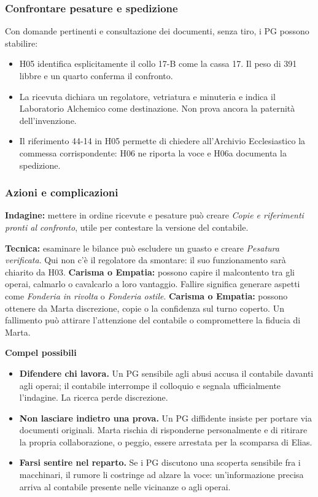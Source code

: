\documentclass[11pt,a4paper]{article}
\newcommand{\aspect}[1]{\textit{\textcolor{blood}{#1}}}
\begin{document}
\subsubsection{Confrontare pesature e spedizione}
\begin{cluebox}
Con domande pertinenti e consultazione dei documenti, senza tiro, i PG possono stabilire:
\begin{itemize}
\item H05 identifica esplicitamente il collo 17-B come la cassa 17. Il peso di 391 libbre e un quarto conferma il confronto.
\item La ricevuta dichiara un regolatore, vetriatura e minuteria e indica il Laboratorio Alchemico come destinazione. Non prova ancora la paternità dell'invenzione.
\item Il riferimento 44-14 in H05 permette di chiedere all'Archivio Ecclesiastico la commessa corrispondente: H06 ne riporta la voce e H06a documenta la spedizione.
\end{itemize}
\end{cluebox}

\subsubsection{Azioni e complicazioni}
\begin{fatebox}
\textbf{Indagine:} mettere in ordine ricevute e pesature può creare \aspect{Copie e riferimenti pronti al confronto}, utile per contestare la versione del contabile.

\textbf{Tecnica:} esaminare le bilance può escludere un guasto e creare \aspect{Pesatura verificata}. Qui non c'è il regolatore da smontare: il suo funzionamento sarà chiarito da H03.
\textbf{Carisma o Empatia:} possono capire il malcontento tra gli operai, calmarlo o cavalcarlo a loro vantaggio. Fallire significa generare aspetti come \aspect{Fonderia in rivolta} o \aspect{Fonderia ostile}.
\textbf{Carisma o Empatia:} possono ottenere da Marta discrezione, copie o la confidenza sul turno coperto. Un fallimento può attirare l'attenzione del contabile o compromettere la fiducia di Marta.
\end{fatebox}

\textbf{Compel possibili}
\begin{itemize}
\item \textbf{Difendere chi lavora.} Un PG sensibile agli abusi accusa il contabile davanti agli operai; il contabile interrompe il colloquio e segnala ufficialmente l'indagine. La ricerca perde discrezione.
\item \textbf{Non lasciare indietro una prova.} Un PG diffidente insiste per portare via documenti originali. Marta rischia di risponderne personalmente e di ritirare la propria collaborazione, o peggio, essere arrestata per la scomparsa di Elias.
\item \textbf{Farsi sentire nel reparto.} Se i PG discutono una scoperta sensibile fra i macchinari, il rumore li costringe ad alzare la voce: un'informazione precisa arriva al contabile presente nelle vicinanze o agli operai.
\end{itemize}
\end{document}
